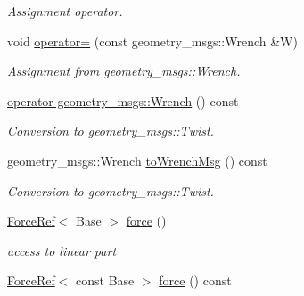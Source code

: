 \begin{DoxyCompactItemize}
\begin{DoxyCompactList}\small\item\em Assignment operator. \end{DoxyCompactList}\item 
void \hyperlink{classow__core_1_1Wrench_a8fcbb87b2ff0e2c7742def7ac08903ba}{operator=} (const geometry\+\_\+msgs\+::\+Wrench \&W)\hypertarget{classow__core_1_1Wrench_a8fcbb87b2ff0e2c7742def7ac08903ba}{}\label{classow__core_1_1Wrench_a8fcbb87b2ff0e2c7742def7ac08903ba}

\begin{DoxyCompactList}\small\item\em Assignment from geometry\+\_\+msgs\+::\+Wrench. \end{DoxyCompactList}\item 
\hyperlink{classow__core_1_1Wrench_a08aa041f5fc3fbe34dbede0807d10e1e}{operator geometry\+\_\+msgs\+::\+Wrench} () const \hypertarget{classow__core_1_1Wrench_a08aa041f5fc3fbe34dbede0807d10e1e}{}\label{classow__core_1_1Wrench_a08aa041f5fc3fbe34dbede0807d10e1e}

\begin{DoxyCompactList}\small\item\em Conversion to geometry\+\_\+msgs\+::\+Twist. \end{DoxyCompactList}\item 
geometry\+\_\+msgs\+::\+Wrench \hyperlink{classow__core_1_1Wrench_a304d746f248d1503c41c3dde2d4bb674}{to\+Wrench\+Msg} () const \hypertarget{classow__core_1_1Wrench_a304d746f248d1503c41c3dde2d4bb674}{}\label{classow__core_1_1Wrench_a304d746f248d1503c41c3dde2d4bb674}

\begin{DoxyCompactList}\small\item\em Conversion to geometry\+\_\+msgs\+::\+Twist. \end{DoxyCompactList}\item 
\hyperlink{classow__core_1_1ForceRef}{Force\+Ref}$<$ Base $>$ \hyperlink{classow__core_1_1Wrench_a1280c591f4fc192916f6398d92074870}{force} ()\hypertarget{classow__core_1_1Wrench_a1280c591f4fc192916f6398d92074870}{}\label{classow__core_1_1Wrench_a1280c591f4fc192916f6398d92074870}

\begin{DoxyCompactList}\small\item\em access to linear part \end{DoxyCompactList}\item 
\hyperlink{classow__core_1_1ForceRef}{Force\+Ref}$<$ const Base $>$ \hyperlink{classow__core_1_1Wrench_a4e8dce56464223a729052e6ad83dbe52}{force} () const \hypertarget{classow__core_1_1Wrench_a4e8dce56464223a729052e6ad83dbe52}{}\label{classow__core_1_1Wrench_a4e8dce56464223a729052e6ad83dbe52}


\end{DoxyCompactItemize}
